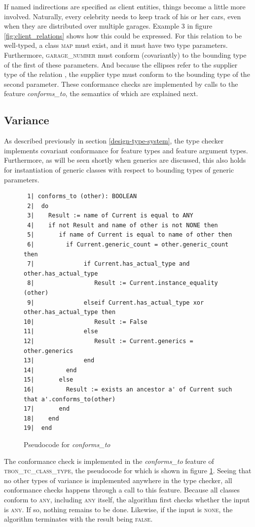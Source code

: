 If named indirections are specified as client entities, things become a little more involved. Naturally, every celebrity needs to keep track of his or her cars, even when they are distributed over multiple garages. Example 3 in figure \ref{fig:client_relations} shows how this could be expressed. For this relation to be well-typed, a class \textsc{map} must exist, and it must have two type parameters. Furthermore, \textsc{garage\_number} must conform (covariantly) to the bounding type of the first of these parameters. And because the ellipses refer to the supplier type of the relation \cite[p.~371]{walden1995}, the supplier type must conform to the bounding type of the second parameter. These conformance checks are implemented by calls to the feature \textit{conforms\_to}, the semantics of which are explained next.
\subsection{Variance}
\label{implementation-variance}
As described previously in section \ref{design-type-system}, the type checker implements covariant conformance for feature types and feature argument types. Furthermore, as will be seen shortly when generics are discussed, this also holds for instantiation of generic classes with respect to bounding types of generic parameters.
\begin{figure}[H]
{\footnotesize
\begin{verbatim}
 1| conforms_to (other): BOOLEAN
 2|  do
 3|    Result := name of Current is equal to ANY
 4|    if not Result and name of other is not NONE then
 5|       if name of Current is equal to name of other then
 6|         if Current.generic_count = other.generic_count then
 7|              if Current.has_actual_type and other.has_actual_type
 8|                 Result := Current.instance_equality (other)
 9|              elseif Current.has_actual_type xor other.has_actual_type then
10|                 Result := False
11|              else
12|                 Result := Current.generics = other.generics
13|              end
14|         end
15|       else
16|         Result := exists an ancestor a' of Current such that a'.conforms_to(other)
17|       end
18|    end
19|  end
\end{verbatim}
}
\caption{Pseudocode for \textit{conforms\_to}}
\label{fig:conforms_to}
\end{figure}
The conformance check is implemented in the \textit{conforms\_to} feature of \textsc{tbon\_tc\_class\_type}, the pseudocode for which is shown in figure \ref{fig:conforms_to}. Seeing that no other types of variance is implemented anywhere in the type checker, all conformance checks happens through a call to this feature.
Because all classes conform to \textsc{any}, including \textsc{any} itself, the algorithm first checks whether the input is \textsc{any}. If so, nothing remains to be done. Likewise, if the input is \textsc{none}, the algorithm terminates with the result being \textsc{false}.

